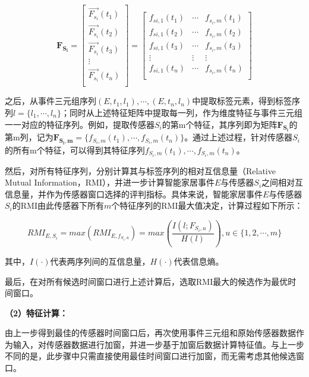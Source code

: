 \begin{equation}
	\label{eq:feature_matrix}
	\mathbf{F_{S_i}}=
	\left[
		\begin{array}{c}
			\vec{F_{s_i}}(t_1) \\ 
			\vec{F_{s_i}}(t_2) \\ 
			\vec{F_{s_i}}(t_3) \\ 
			\vdots \\ 
			\vec{F_{s_i}}(t_n) \\ 
		\end{array}
	\right]
	=
	\left[
		\begin{array}{ccc}
			f_{si,1}(t_1) & \cdots & f_{s_i,m}(t_1) \\
			f_{si,1}(t_2) & \cdots & f_{s_i,m}(t_2) \\
			f_{si,1}(t_3) & \cdots & f_{s_i,m}(t_3) \\
			\vdots & \vdots & \vdots \\
			f_{si,1}(t_n) & \cdots & f_{s_i,m}(t_n) \\
		\end{array}
	\right]
\end{equation}

之后，从事件三元组序列$(E,t_1,l_1),\cdots ,(E,t_n,l_n)$中提取标签元素，得到标签序列$l=\{l_1,\cdots ,l_n\}$；同时从上述特征矩阵中提取每一列，作为维度特征与事件三元组一一对应的特征序列。例如，提取传感器$S_i$的第m个特征，其序列即为矩阵$\mathbf{F_{S_i}}$的第m列，记为$\mathbf{F_{S_i,m}}=\{f_{S_i,m}(t_1),\cdots ,f_{S_i,m}(t_n)\}$。通过上述过程，针对传感器$S_i$的所有m个特征，可以得到其特征序列$f_{S_i,m}(t_1),\cdots ,f_{S_i,m}(t_n)$。

然后，对所有特征序列，分别计算其与标签序列的相对互信息量（Relative Mutual Information，RMI），并进一步计算智能家居事件$E$与传感器$S_i$之间相对互信息量，并作为传感器窗口选择的评判指标。具体来说，智能家居事件$E$与传感器$S_i$的RMI由此传感器下所有$m$个特征序列的RMI最大值决定，计算过程如下所示：

\begin{equation}
	\label{eq:rmi}
	RMI_{E,S_i}={max}(RMI_{E,f_{S_i,u}})={max}(\frac{I(l;F_{S_i,u} )}{H(l)}),u\in \{1,2,\cdots,m\}
\end{equation}

其中，$I(\cdot)$代表两序列间的互信息量，$H(\cdot)$代表信息熵。

最后，在对所有候选时间窗口进行上述计算后，选取RMI最大的候选作为最优时间窗口。


\textbf{（2）特征计算：}

由上一步得到最佳的传感器时间窗口后，再次使用事件三元组和原始传感器数据作为输入，对传感器数据进行加窗，并进一步基于加窗后数据计算特征值。与上一步不同的是，此步骤中只需直接使用最佳时间窗口进行加窗，而无需考虑其他候选窗口。

